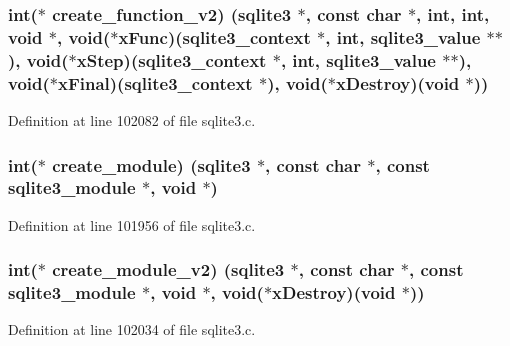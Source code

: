 \subsubsection[{create\+\_\+function\+\_\+v2}]{\setlength{\rightskip}{0pt plus 5cm}int($\ast$ create\+\_\+function\+\_\+v2) ({\bf sqlite3} $\ast$, const char $\ast$, int, int, void $\ast$, void($\ast$x\+Func)({\bf sqlite3\+\_\+context} $\ast$, int, sqlite3\+\_\+value $\ast$$\ast$), void($\ast$x\+Step)({\bf sqlite3\+\_\+context} $\ast$, int, sqlite3\+\_\+value $\ast$$\ast$), void($\ast$x\+Final)({\bf sqlite3\+\_\+context} $\ast$), void($\ast$x\+Destroy)(void $\ast$))}\label{structsqlite3__api__routines_a1a912b5c2885793c368c811d6c4a1fe1}


Definition at line 102082 of file sqlite3.\+c.

\hypertarget{structsqlite3__api__routines_ab2793fe92f6ecd986d036e43915f0c5b}{}
\subsubsection[{create\+\_\+module}]{\setlength{\rightskip}{0pt plus 5cm}int($\ast$ create\+\_\+module) ({\bf sqlite3} $\ast$, const char $\ast$, const {\bf sqlite3\+\_\+module} $\ast$, void $\ast$)}\label{structsqlite3__api__routines_ab2793fe92f6ecd986d036e43915f0c5b}


Definition at line 101956 of file sqlite3.\+c.

\hypertarget{structsqlite3__api__routines_a27b33b7aa00bc2e6cf467e5e8aede3ca}{}
\subsubsection[{create\+\_\+module\+\_\+v2}]{\setlength{\rightskip}{0pt plus 5cm}int($\ast$ create\+\_\+module\+\_\+v2) ({\bf sqlite3} $\ast$, const char $\ast$, const {\bf sqlite3\+\_\+module} $\ast$, void $\ast$, void($\ast$x\+Destroy)(void $\ast$))}\label{structsqlite3__api__routines_a27b33b7aa00bc2e6cf467e5e8aede3ca}


Definition at line 102034 of file sqlite3.\+c.

